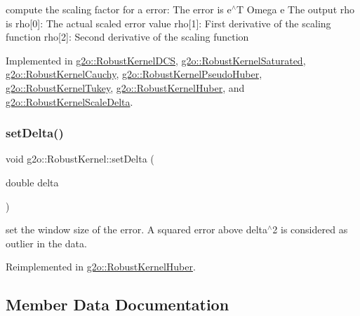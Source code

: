 compute the scaling factor for a error\+: The error is e$^\wedge$T Omega e The output rho is rho\mbox{[}0\mbox{]}\+: The actual scaled error value rho\mbox{[}1\mbox{]}\+: First derivative of the scaling function rho\mbox{[}2\mbox{]}\+: Second derivative of the scaling function 

Implemented in \mbox{\hyperlink{classg2o_1_1_robust_kernel_d_c_s_aa469fa37ee76e4483108110b58d5823d}{g2o\+::\+Robust\+Kernel\+D\+CS}}, \mbox{\hyperlink{classg2o_1_1_robust_kernel_saturated_a2f937dd7f393f52b0c947d8a29f0d8aa}{g2o\+::\+Robust\+Kernel\+Saturated}}, \mbox{\hyperlink{classg2o_1_1_robust_kernel_cauchy_abec224380964f491c74ef173e7ae5afd}{g2o\+::\+Robust\+Kernel\+Cauchy}}, \mbox{\hyperlink{classg2o_1_1_robust_kernel_pseudo_huber_a7dab9bbb0e6f204a5f863220d606b0da}{g2o\+::\+Robust\+Kernel\+Pseudo\+Huber}}, \mbox{\hyperlink{classg2o_1_1_robust_kernel_tukey_a415fbc0b4033a8330700e66c60305b13}{g2o\+::\+Robust\+Kernel\+Tukey}}, \mbox{\hyperlink{classg2o_1_1_robust_kernel_huber_aa437e8a62360ba63b56b383aac8e4674}{g2o\+::\+Robust\+Kernel\+Huber}}, and \mbox{\hyperlink{classg2o_1_1_robust_kernel_scale_delta_a97376c3ba35370fa551e899fd5391a2f}{g2o\+::\+Robust\+Kernel\+Scale\+Delta}}.

\mbox{\label{classg2o_1_1_robust_kernel_a8d85269635c436fca51324d7cb16a798}} 
\subsubsection{\texorpdfstring{set\+Delta()}{setDelta()}}
{\footnotesize\ttfamily void g2o\+::\+Robust\+Kernel\+::set\+Delta (\begin{DoxyParamCaption}\item[{double}]{delta }\end{DoxyParamCaption})\hspace{0.3cm}{\ttfamily [virtual]}}

set the window size of the error. A squared error above delta$^\wedge$2 is considered as outlier in the data. 

Reimplemented in \mbox{\hyperlink{classg2o_1_1_robust_kernel_huber_a7e9ee4bbc9483dcd3d10a4c1f506a4d2}{g2o\+::\+Robust\+Kernel\+Huber}}.



\subsection{Member Data Documentation}
\mbox{\label{classg2o_1_1_robust_kernel_a4b03953a6e7bfca64efea37fb98548aa}} 
